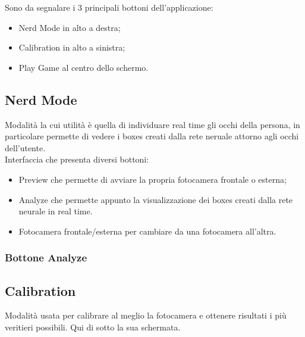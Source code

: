 \documentclass[11pt]{article}
\begin{document}
Sono da segnalare i 3 principali bottoni dell'applicazione:
\begin{itemize}
\item Nerd Mode in alto a destra;
\item Calibration in alto a sinistra;
\item Play Game al centro dello schermo.
\end{itemize}

\subsection{Nerd Mode}
Modalità la cui utilità è quella di individuare real time gli occhi della persona, in particolare permette di vedere i boxes creati dalla rete neruale attorno agli occhi dell'utente.
\\Interfaccia che presenta diversi bottoni:
\begin{itemize}
    \item Preview che permette di avviare la propria fotocamera frontale o esterna;
    \item Analyze che permette appunto la visualizzazione dei boxes creati dalla rete neurale in real time.
    \item Fotocamera frontale/esterna per cambiare da una fotocamera all'altra.
\end{itemize}
\subsubsection{Bottone Analyze}


\subsection{Calibration}
Modalità usata per calibrare al meglio la fotocamera e ottenere risultati i più veritieri possibili. Qui di sotto la sua schermata.
\end{document}
